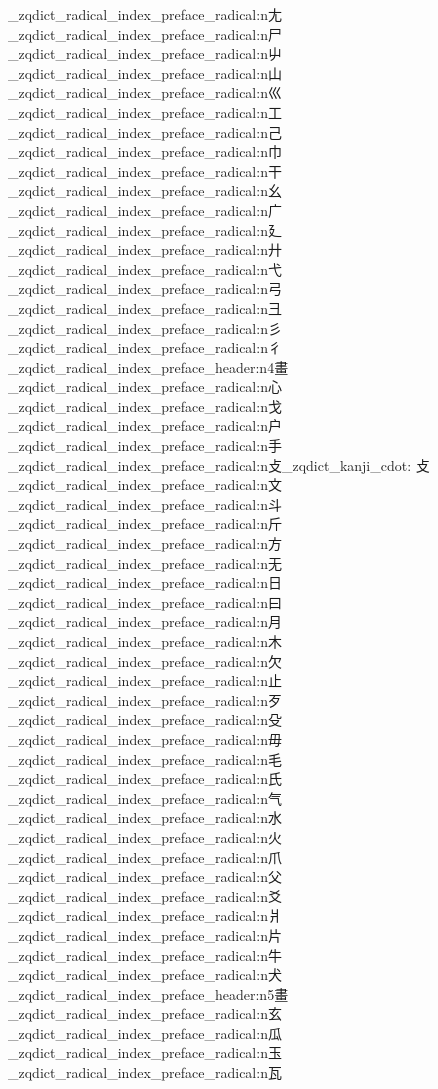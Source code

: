 {\begin{multicols}{5}
  \_zqdict_radical_index_preface_radical:n{尢}
  \_zqdict_radical_index_preface_radical:n{尸}
  \_zqdict_radical_index_preface_radical:n{屮}
  \_zqdict_radical_index_preface_radical:n{山}
  \_zqdict_radical_index_preface_radical:n{巛}
  \_zqdict_radical_index_preface_radical:n{工}
  \_zqdict_radical_index_preface_radical:n{己}
  \_zqdict_radical_index_preface_radical:n{巾}
  \_zqdict_radical_index_preface_radical:n{干}
  \_zqdict_radical_index_preface_radical:n{幺}
  \_zqdict_radical_index_preface_radical:n{广}
  \_zqdict_radical_index_preface_radical:n{廴}
  \_zqdict_radical_index_preface_radical:n{廾}
  \_zqdict_radical_index_preface_radical:n{弋}
  \_zqdict_radical_index_preface_radical:n{弓}
  \_zqdict_radical_index_preface_radical:n{彐}
  \_zqdict_radical_index_preface_radical:n{彡}
  \_zqdict_radical_index_preface_radical:n{彳}
  \_zqdict_radical_index_preface_header:n{4畫}
  \_zqdict_radical_index_preface_radical:n{心}
  \_zqdict_radical_index_preface_radical:n{戈}
  \_zqdict_radical_index_preface_radical:n{户}
  \_zqdict_radical_index_preface_radical:n{手}
  \_zqdict_radical_index_preface_radical:n{攴\_zqdict_kanji_cdot: 攴}
  \_zqdict_radical_index_preface_radical:n{文}
  \_zqdict_radical_index_preface_radical:n{斗}
  \_zqdict_radical_index_preface_radical:n{斤}
  \_zqdict_radical_index_preface_radical:n{方}
  \_zqdict_radical_index_preface_radical:n{无}
  \_zqdict_radical_index_preface_radical:n{日}
  \_zqdict_radical_index_preface_radical:n{曰}
  \_zqdict_radical_index_preface_radical:n{月}
  \_zqdict_radical_index_preface_radical:n{木}
  \_zqdict_radical_index_preface_radical:n{欠}
  \_zqdict_radical_index_preface_radical:n{止}
  \_zqdict_radical_index_preface_radical:n{歹}
  \_zqdict_radical_index_preface_radical:n{殳}
  \_zqdict_radical_index_preface_radical:n{毋}
  \_zqdict_radical_index_preface_radical:n{毛}
  \_zqdict_radical_index_preface_radical:n{氏}
  \_zqdict_radical_index_preface_radical:n{气}
  \_zqdict_radical_index_preface_radical:n{水}
  \_zqdict_radical_index_preface_radical:n{火}
  \_zqdict_radical_index_preface_radical:n{爪}
  \_zqdict_radical_index_preface_radical:n{父}
  \_zqdict_radical_index_preface_radical:n{爻}
  \_zqdict_radical_index_preface_radical:n{爿}
  \_zqdict_radical_index_preface_radical:n{片}
  \_zqdict_radical_index_preface_radical:n{牛}
  \_zqdict_radical_index_preface_radical:n{犬}
  \_zqdict_radical_index_preface_header:n{5畫}
  \_zqdict_radical_index_preface_radical:n{玄}
  \_zqdict_radical_index_preface_radical:n{瓜}
  \_zqdict_radical_index_preface_radical:n{玉}
  \_zqdict_radical_index_preface_radical:n{瓦}

\end{multicols}}
